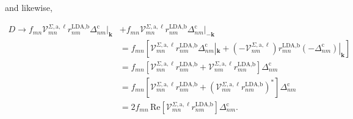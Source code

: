 and likewise,

\begin{align}\label{dt}
D \rightarrow f_{mn}\mathcal{V}^{\Sigma,\text{a},\ell}_{mn}
    r^{\text{LDA,b}}_{nm}\Delta^{\text{c}}_{nm}|_{\mathbf{k}} 
&+  f_{mn}\mathcal{V}^{\Sigma,\text{a},\ell}_{mn}r^{\text{LDA,b}}_{nm}
    \Delta^{\text{c}}_{nm}|_{-\mathbf{k}}\nonumber\\
&=  f_{mn}\left[\mathcal{V}^{\Sigma,\text{a},\ell}_{mn}r^{\text{LDA,b}}_{nm}
    \Delta^{\text{c}}_{nm}|_{\mathbf{k}}
+   \left(-\mathcal{V}^{\Sigma,\text{a},\ell}_{nm}\right)r^{\text{LDA,b}}_{mn}
    \left(-\Delta^{\text{c}}_{nm}\right)|_{\mathbf{k}}\right]\nonumber\\
&=  f_{mn}\left[\mathcal{V}^{\Sigma,\text{a},\ell}_{mn}r^{\text{LDA,b}}_{nm}
+   \mathcal{V}^{\Sigma,\text{a},\ell}_{nm}r^{\text{LDA,b}}_{mn}\right]
    \Delta^{\text{c}}_{nm}\nonumber\\
&=  f_{mn}\left[\mathcal{V}^{\Sigma,\text{a},\ell}_{mn}r^{\text{LDA,b}}_{nm}
+   \left(\mathcal{V}^{\Sigma,\text{a},\ell}_{mn}
    r^{\text{LDA,b}}_{nm}\right)^*\right]\Delta^{\text{c}}_{nm}\nonumber\\
&=  2f_{mn}\,\mathrm{Re}\left[\mathcal{V}^{\Sigma,\text{a},\ell}_{mn}
    r^{\text{LDA,b}}_{nm}\right]\Delta^{\text{c}}_{nm}
.
\end{align}

